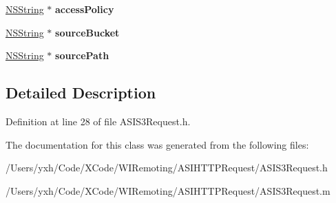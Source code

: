 \begin{DoxyCompactItemize}
\item 
\hypertarget{interface_a_s_i_s3_request_aae8aa542f29abfd7f87be3c3cafebdeb}{
\hyperlink{class_n_s_string}{NSString} $\ast$ {\bfseries accessPolicy}}
\label{interface_a_s_i_s3_request_aae8aa542f29abfd7f87be3c3cafebdeb}

\item 
\hypertarget{interface_a_s_i_s3_request_a7821720ceee1bed8beda18aa61cc182c}{
\hyperlink{class_n_s_string}{NSString} $\ast$ {\bfseries sourceBucket}}
\label{interface_a_s_i_s3_request_a7821720ceee1bed8beda18aa61cc182c}

\item 
\hypertarget{interface_a_s_i_s3_request_ae6c2fa8893eb31961a1584bb71ac9d85}{
\hyperlink{class_n_s_string}{NSString} $\ast$ {\bfseries sourcePath}}
\label{interface_a_s_i_s3_request_ae6c2fa8893eb31961a1584bb71ac9d85}

\end{DoxyCompactItemize}


\subsection{Detailed Description}


Definition at line 28 of file ASIS3Request.h.

The documentation for this class was generated from the following files:\begin{DoxyCompactItemize}
\item 
/Users/yxh/Code/XCode/WIRemoting/ASIHTTPRequest/ASIS3Request.h\item 
/Users/yxh/Code/XCode/WIRemoting/ASIHTTPRequest/ASIS3Request.m\end{DoxyCompactItemize}
